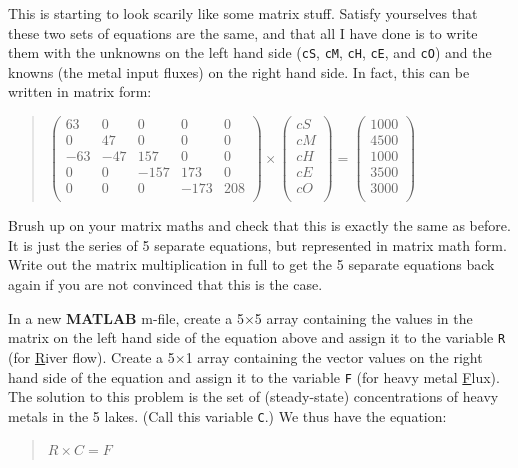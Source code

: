 \documentclass{tufte-book} %
\newenvironment{docspec}{\begin{quotation}\ttfamily\parskip0pt\parindent0pt\ignorespaces}{\end{quotation}}
\begin{document}
This is starting to look scarily like some matrix stuff. Satisfy yourselves that these two sets of equations  are the same, and that all I have done is to write them with the unknowns on the left hand side (\texttt{cS}, \texttt{cM}, \texttt{cH}, \texttt{cE}, and \texttt{cO}) and the knowns (the metal input fluxes) on the right hand side. In fact, this can be written in matrix form:

\begin{docspec}
\(\begin{pmatrix}
63 & 0 & 0 & 0 & 0 \\
0 & 47 & 0 & 0 & 0 \\
-63 & -47 & 157 & 0 & 0 \\
0 & 0 & -157 & 173 & 0 \\
0 & 0 & 0 & -173 & 208 \\
\end{pmatrix}
\times
\begin{pmatrix}
cS \\
cM \\
cH \\
cE \\
cO \\
\end{pmatrix}
=
\begin{pmatrix}
1000 \\
4500 \\
1000 \\
3500 \\
3000 \\
\end{pmatrix}\)
\end{docspec}

Brush up on your matrix maths and check that this is exactly the same as before. It is just the series of 5 separate equations, but represented in matrix math form. Write out the matrix multiplication in full to get the 5 separate equations back again if you are not convinced that this is the case.

In a new \textbf{MATLAB} \textsf{m-file}, create a 5\(\times\)5 array containing the values in the matrix on the left hand side of the equation above and assign it to the variable \texttt{R} (for \uline{R}iver flow). Create a 5\(\times\)1 array containing the vector values on the right hand side of the equation and assign it to the variable \texttt{F} (for heavy metal \uline{F}lux). The solution to this problem is the set of (steady-state) concentrations of heavy metals in the 5 lakes. (Call this variable \texttt{C}.) We thus have the equation:
\begin{docspec}
\(R \times C = F\)
\end{docspec}
\end{document}
